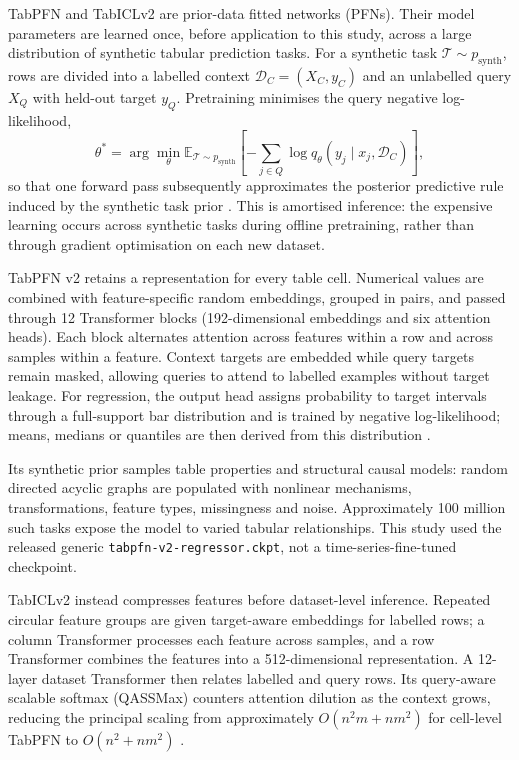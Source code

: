 TabPFN and TabICLv2 are prior-data fitted networks (PFNs).  Their model
parameters are learned once, before application to this study, across a large
distribution of synthetic tabular prediction tasks.  For a synthetic task
$\mathcal T\sim p_{\mathrm{synth}}$, rows are divided into a labelled context
$\mathcal D_C=(X_C,y_C)$ and an unlabelled query $X_Q$ with held-out target
$y_Q$.  Pretraining minimises the query negative log-likelihood,
\begin{equation}
\theta^*=\arg\min_\theta
\mathbb E_{\mathcal T\sim p_{\mathrm{synth}}}
\left[-\sum_{j\in Q}\log q_\theta
\left(y_j\mid x_j,\mathcal D_C\right)\right],
\label{eq:app-pfn-pretraining}
\end{equation}
so that one forward pass subsequently approximates the posterior predictive
rule induced by the synthetic task prior
\cite{hollmann2023tabpfn,hollmann2025tabpfn,qu2025tabicl,qu2026tabiclv2}.
This is amortised inference: the expensive learning occurs across synthetic
tasks during offline pretraining, rather than through gradient optimisation on
each new dataset.

TabPFN v2 retains a representation for every table cell.  Numerical values are
combined with feature-specific random embeddings, grouped in pairs, and passed
through 12 Transformer blocks (192-dimensional embeddings and six attention
heads).  Each block alternates attention across features within a row and
across samples within a feature.  Context targets are embedded while query
targets remain masked, allowing queries to attend to labelled examples without
target leakage.  For regression, the output head assigns probability to target
intervals through a full-support bar distribution and is trained by negative
log-likelihood; means, medians or quantiles are then derived from this
distribution \cite{hollmann2025tabpfn}.

Its synthetic prior samples table properties and structural causal models:
random directed acyclic graphs are populated with nonlinear mechanisms,
transformations, feature types, missingness and noise.  Approximately 100
million such tasks expose the model to varied tabular relationships.  This
study used the released generic \texttt{tabpfn-v2-\allowbreak regressor.ckpt}, not a
time-series-fine-tuned checkpoint.

TabICLv2 instead compresses features before dataset-level inference.  Repeated
circular feature groups are given target-aware embeddings for labelled rows; a
column Transformer processes each feature across samples, and a row Transformer
combines the features into a 512-dimensional representation.  A 12-layer
dataset Transformer then relates labelled and query rows.  Its query-aware
scalable softmax (QASSMax) counters attention dilution as the context grows,
reducing the principal scaling from approximately
$O(n^2m+nm^2)$ for cell-level TabPFN to $O(n^2+nm^2)$
\cite{qu2025tabicl,qu2026tabiclv2}.

